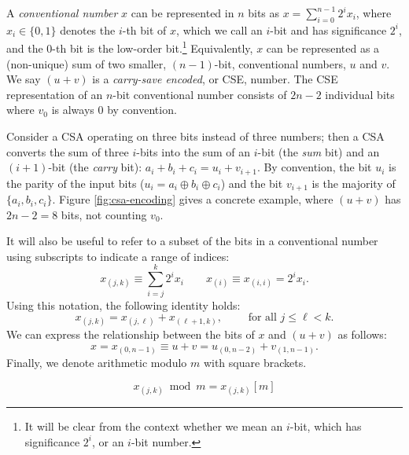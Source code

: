 \documentclass[twoside]{article}
\begin{document}
A \emph{conventional number} $x$ can be represented in $n$ bits as
$x = \sum_{i=0}^{n-1} 2^i x_i$,
where $x_i \in \{0,1\}$ denotes the $i$-th bit of $x$, which we call
an $i$-bit and has significance $2^i$, and the $0$-th bit is the low-order bit.\footnote{It will be clear from the context whether we mean an
$i$-bit, which has significance $2^i$, or an $i$-bit number.}
Equivalently, $x$ can be represented as a (non-unique)
sum of two smaller, $(n-1)$-bit, conventional numbers, $u$ and $v$.
We say $(u+v)$ is a \emph{carry-save encoded}, or CSE, number.
The CSE representation of an $n$-bit conventional number
consists of $2n-2$ individual
bits where $v_0$ is always $0$ by convention.

Consider a CSA operating on three bits instead of three numbers; 
then a CSA converts the sum of three
$i$-bits into the sum of an $i$-bit (the \emph{sum} bit) and an $(i+1)$-bit
(the \emph{carry} bit):
$a_i+b_i+c_i = u_i+v_{i+1}$.
By convention, the bit $u_i$ is the parity of the input bits
($u_i = a_i \oplus b_i \oplus c_i$) and
the bit $v_{i+1}$ is the majority of $\{a_i, b_i, c_i\}$.
Figure \ref{fig:csa-encoding} gives a concrete example, where
$(u+v)$ has $2n-2 = 8$ bits, not counting $v_0$.

%
It will also be useful to refer to a subset of the bits in a conventional
number using subscripts to indicate a range of indices:
\begin{equation}
x_{(j,k)} \equiv \sum_{i=j}^k 2^ix_i \qquad
x_{(i)} \equiv x_{(i,i)} = 2^ix_i.
\end{equation}
%
Using this notation, the following identity holds:
\begin{equation}
x_{(j,k)} = x_{(j,\ell)} + x_{(\ell+1,k)}, \qquad \text{ for all } j \le \ell < k.
\end{equation}
%
We can express the relationship between the bits of $x$ and $(u+v)$ as follows:
%
\begin{equation}
x = x_{(0,n-1)} \equiv u+v = u_{(0,n-2)} + v_{(1,n-1)}.
\end{equation}
%
Finally, we denote arithmetic modulo $m$ with square brackets.

\begin{equation}
x_{(j,k)} \bmod m = x_{(j,k)}[m]
\end{equation}
\end{document}
